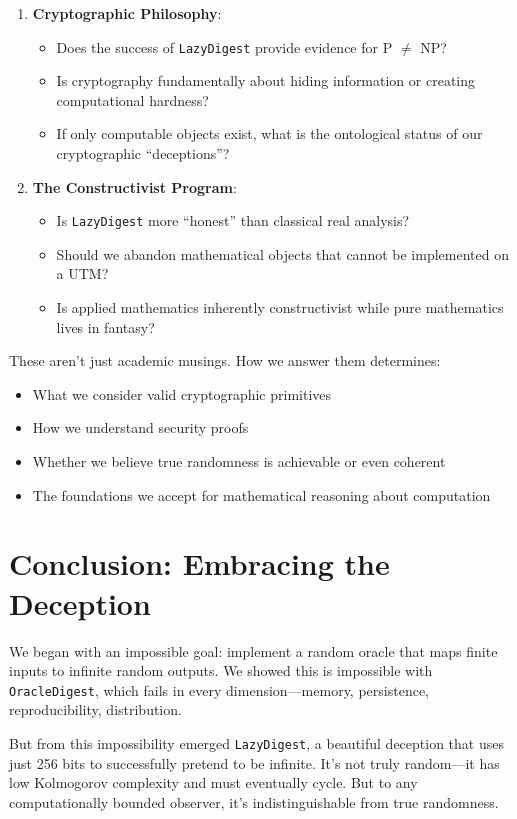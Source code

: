\documentclass[11pt]{article}
\begin{document}
\begin{enumerate}
\item \textbf{Cryptographic Philosophy}:
\begin{itemize}
\item Does the success of \texttt{LazyDigest} provide evidence for P $\neq$ NP?
\item Is cryptography fundamentally about hiding information or creating computational hardness?
\item If only computable objects exist, what is the ontological status of our cryptographic ``deceptions''?
\end{itemize}

\item \textbf{The Constructivist Program}:
\begin{itemize}
\item Is \texttt{LazyDigest} more ``honest'' than classical real analysis?
\item Should we abandon mathematical objects that cannot be implemented on a UTM?
\item Is applied mathematics inherently constructivist while pure mathematics lives in fantasy?
\end{itemize}
\end{enumerate}

These aren't just academic musings. How we answer them determines:
\begin{itemize}
\item What we consider valid cryptographic primitives
\item How we understand security proofs
\item Whether we believe true randomness is achievable or even coherent
\item The foundations we accept for mathematical reasoning about computation
\end{itemize}

\section{Conclusion: Embracing the Deception}

We began with an impossible goal: implement a random oracle that maps finite inputs to infinite random outputs. We showed this is impossible with \texttt{OracleDigest}, which fails in every dimension---memory, persistence, reproducibility, distribution.

But from this impossibility emerged \texttt{LazyDigest}, a beautiful deception that uses just 256 bits to successfully pretend to be infinite. It's not truly random---it has low Kolmogorov complexity and must eventually cycle. But to any computationally bounded observer, it's indistinguishable from true randomness.
\end{document}
